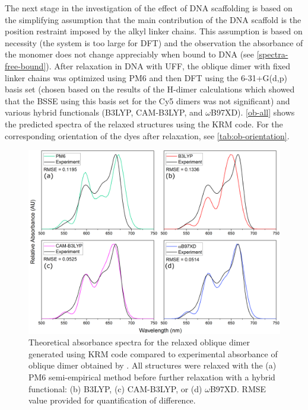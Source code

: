 The next stage in the investigation of the effect of DNA scaffolding is based on the simplifying assumption that the main contribution of the DNA scaffold is the position restraint imposed by the alkyl linker chains. This assumption is based on necessity (the system is too large for DFT) and the observation the absorbance of the monomer does not change appreciably when bound to DNA (see \autoref{spectra-free-bound}). After relaxation in DNA with UFF, the oblique dimer with fixed linker chains was optimized using PM6 and then DFT using the 6-31+G(d,p) basis set (chosen based on the results of the H-dimer calculations which showed that the BSSE using this basis set for the Cy5 dimers was not significant) and various hybrid functionals (B3LYP, CAM-B3LYP, and $\omega$B97XD). \autoref{ob-all} shows the predicted spectra of the relaxed structures using the KRM code. For the corresponding orientation of the dyes after relaxation, see \autoref{tab:ob-orientation}. 
\begin{figure}[h!]
    \centering
    \includegraphics[width=0.8\linewidth]{figures/pub1/obdimer-all-ad.pdf}
    \caption[Theoretical absorbance spectra for the relaxed oblique dimer generated using KRM code compared to experimental absorbance of oblique dimer obtained by Cannon. All structures were relaxed with the (a) PM6 semi-empirical method before further relaxation with a hybrid functional: (b) B3LYP, (c) CAM-B3LYP, or (d) $\omega$B97XD. RMSE value provided for quantification of difference.]{Theoretical absorbance spectra for the relaxed oblique dimer generated using KRM code compared to experimental absorbance of oblique dimer obtained by \cite{Cannon2017}. All structures were relaxed with the (a) PM6 semi-empirical method before further relaxation with a hybrid functional: (b) B3LYP, (c) CAM-B3LYP, or (d) $\omega$B97XD. RMSE value provided for quantification of difference.}\label{ob-all}
\end{figure}

